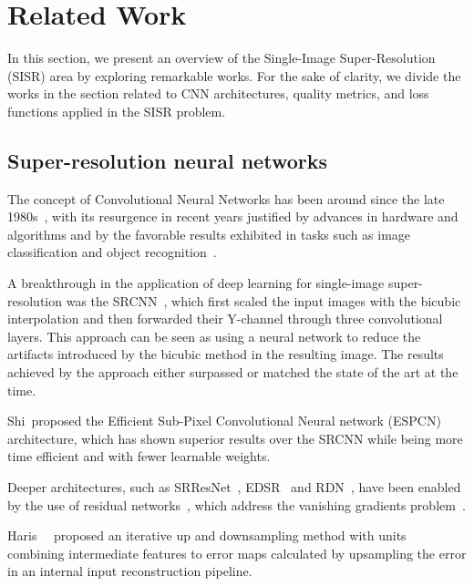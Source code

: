 \section{Related Work}

In this section, we present an overview of the Single-Image Super-Resolution (SISR) area by exploring remarkable works. For the sake of clarity, we divide the works in the section related to CNN architectures, quality metrics, and loss functions applied in the SISR problem.

\subsection{Super-resolution neural networks}

The concept of Convolutional Neural Networks has been around since the late 1980s~\cite{lecun1989backpropagation}, with its resurgence in recent years justified by advances in hardware and algorithms and by the favorable results exhibited in tasks such as image classification and object recognition~\cite{dong2015image,yang2019deep}.

A breakthrough in the application of deep learning for single-image super-resolution was the SRCNN~\cite{dong2015image}, which first scaled the input images with the bicubic interpolation and then forwarded their Y-channel through three convolutional layers. This approach can be seen as using a neural network to reduce the artifacts introduced by the bicubic method in the resulting image. The results achieved by the approach either surpassed or matched the state of the art at the time.

Shi~\etal proposed the Efficient Sub-Pixel Convolutional Neural network (ESPCN)~\cite{shi2016realtime} architecture, which has shown superior results over the SRCNN while being more time efficient and with fewer learnable weights. 

Deeper architectures, such as SRResNet~\cite{ledig2017photorealistic}, EDSR~\cite{lim2017enhanced} and RDN~\cite{zhang2018residual}, have been enabled by the use of residual networks~\cite{he2016deep}, which address the vanishing gradients problem~\cite{bengio1994learning}.

Haris~\etal~\cite{haris2018deep} proposed an iterative up and downsampling method with units combining intermediate features to error maps calculated by upsampling the error in an internal input reconstruction pipeline.

